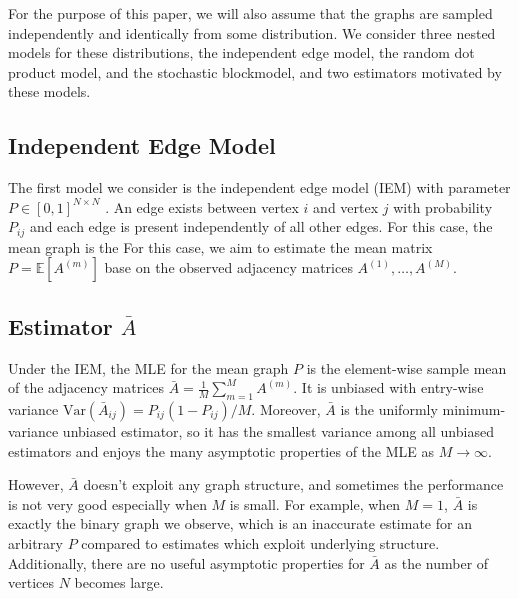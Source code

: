 \documentclass[a4paper]{article}
\newcommand{\Ex}{\mathbb{E}}
\begin{document}
For the purpose of this paper, we will also assume that the graphs are sampled independently and identically from some distribution.
We consider three nested models for these distributions, the independent edge model, the random dot product model, and the stochastic blockmodel, and two estimators motivated by these models.



\subsection{Independent Edge Model}
The first model we consider is the independent edge model (IEM) with parameter $P \in [0,1]^{N\times N}$ \citep{bollobas2007phase}.
An edge exists between vertex $i$ and vertex $j$ with probability $P_{ij}$ and each edge is present independently of all other edges. 
For this case, the mean graph is the 
For this case, we aim to estimate the mean matrix $P=\Ex[A^{(m)}]$ base on the observed adjacency matrices $A^{(1)},\dotsc,A^{(M)}$.



\subsection{Estimator $\bar{A}$}
Under the IEM, the MLE for the mean graph $P$ is the element-wise sample mean of the adjacency matrices $\bar{A}=\frac{1}{M}\sum_{m=1}^M A^{(m)}$.
It is unbiased with entry-wise variance $\mathrm{Var}(\bar{A}_{ij}) = P_{ij} (1-P_{ij})/M$. Moreover, $\bar{A}$ is the uniformly minimum-variance unbiased estimator, so it has the smallest variance among all unbiased estimators and enjoys the many asymptotic properties of the MLE as $M\to \infty$.

However, $\bar{A}$ doesn't exploit any graph structure, and sometimes the performance is not very good especially when $M$ is small. 
For example, when $M=1$, $\bar{A}$ is exactly the binary graph we observe, which is an inaccurate estimate for an arbitrary $P$ compared to estimates which exploit underlying structure.
Additionally, there are no useful asymptotic properties for $\bar{A}$ as the number of vertices $N$ becomes large.
\end{document}
